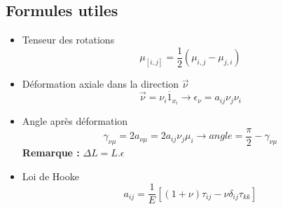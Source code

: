 \subsection*{Formules utiles}
\begin{itemize}
	\item Tenseur des rotations
		\begin{equation}
			\mu _{[i,j]} = \frac{1}{2}(\mu _{i,j} - \mu _{j,i})
		\end{equation}
		
	\item Déformation axiale dans la direction $\vec{\nu}$
		\begin{equation}
			\vec{\nu} = \nu _i \overline{1}_{x_i} \rightarrow \epsilon _{\nu} = a_{ij} \nu _j \nu _i
		\end{equation}
		
	\item	Angle après déformation 
		\begin{equation}
			\gamma _{\nu \mu} = 2 a_{\nu \mu} = 2 a_{ij} \nu _j \mu _i \rightarrow angle = \frac{\pi}{2} - \gamma _{\nu \mu} 
		\end{equation}
\textbf{Remarque :} $\Delta L = L.\epsilon$		
	\item Loi de Hooke
		\begin{equation}
			a_{ij} = \frac{1}{E}[(1+\nu)\tau _{ij} - \nu \delta _{ij}\tau _{kk}]
		\end{equation}							
\end{itemize}

